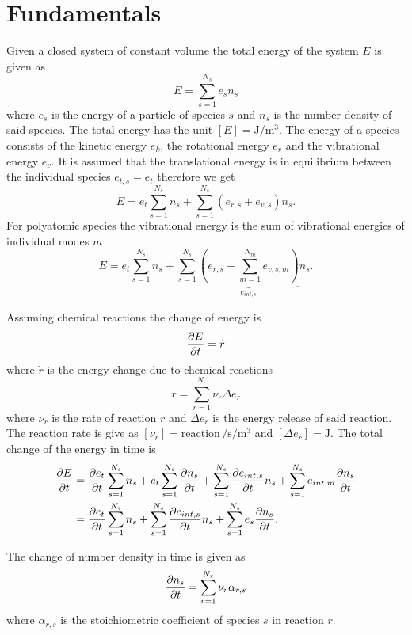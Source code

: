 \documentclass{scrreprt}
\begin{document}
\chapter{Fundamentals}
Given a closed system of constant volume the total energy of the system $E$ is given as
\begin{equation}
	E = \sum_{s = 1}^{N_s} e_s n_s
\end{equation}
where $e_s$ is the energy of a particle of species $s$ and $n_s$ is the number density of said species.
The total energy has the unit $[E] = \si{\joule\per\meter\cubed}$.
The energy of a species consists of the kinetic energy $e_k$, the rotational energy $e_r$ and the vibrational energy $e_v$.
It is assumed that the translational energy is in equilibrium between the individual species $e_{t, s} = e_t$ therefore we get
\begin{equation}
	E = e_t \sum_{s = 1}^{N_s} n_s + \sum_{s = 1}^{N_s} (e_{r, s} + e_{v, s}) n_s.
\end{equation}
For polyatomic species the vibrational energy is the sum of vibrational energies of individual modes $m$
\begin{equation}
	E = e_t \sum_{s = 1}^{N_s} n_s + \sum_{s = 1}^{N_s} \underbrace{\left(e_{r, s} + \sum_{m = 1}^{N_m} e_{v, s, m}\right)}_{e_{int, s}} n_s.
\end{equation}

Assuming chemical reactions the change of energy is
\begin{equation}
	\pdv{E}{t} = \dot{r}
\end{equation}
where $\dot{r}$ is the energy change due to chemical reactions
\begin{equation}
	\dot{r} = \sum_{r = 1}^{N_r} \nu_r \Delta e_r
\end{equation}
where $\nu_r$ is the rate of reaction $r$ and $\Delta e_r$ is the energy release of said reaction.
The reaction rate is give as $[\nu_r] = \mathrm{reaction}\,\si{\per\second\per\meter\cubed}$ and $[\Delta e_r] = \si{\joule}$.
The total change of the energy in time is
\begin{align}
	\pdv{E}{t} &= \pdv{e_t}{t} \sum_{s = 1}^{N_s} n_s + e_t \sum_{s = 1}^{N_s} \pdv{n_s}{t} + \sum_{s = 1}^{N_s} \pdv{e_{int, s}}{t} n_s + \sum_{s = 1}^{N_s} e_{int, m} \pdv{n_s}{t}\\
	&= \pdv{e_t}{t} \sum_{s = 1}^{N_s} n_s + \sum_{s = 1}^{N_s} \pdv{e_{int, s}}{t} n_s + \sum_{s = 1}^{N_s} e_{s} \pdv{n_s}{t}.
\end{align}

The change of number density in time is given as
\begin{equation}
	\pdv{n_s}{t} = \sum_{r = 1}^{N_r} \nu_r \alpha_{r, s}
\end{equation}
where $\alpha_{r, s}$ is the stoichiometric coefficient of species $s$ in reaction $r$.
\end{document}
